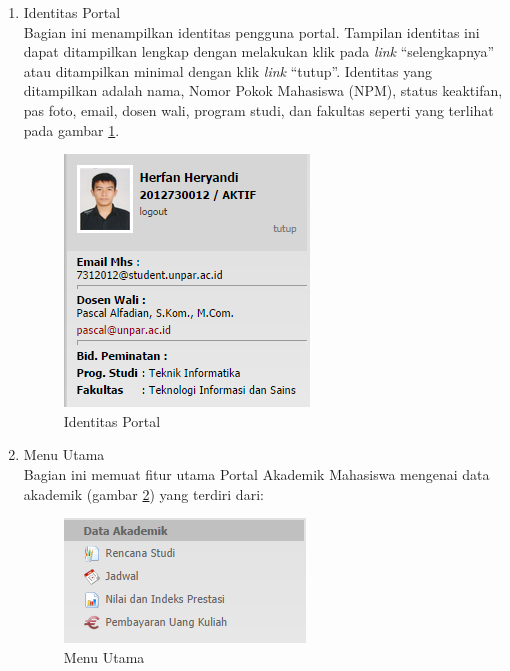 \documentclass[a4paper,twoside]{article}
\begin{document}
\begin{enumerate}
\begin{enumerate}
\begin{enumerate}
	\item Identitas Portal \\
	Bagian ini menampilkan identitas pengguna portal. Tampilan identitas ini dapat ditampilkan lengkap dengan melakukan klik pada \textit{link} ``selengkapnya'' atau ditampilkan minimal dengan klik \textit{link} ``tutup''. Identitas yang ditampilkan adalah nama, Nomor Pokok Mahasiswa (NPM), status keaktifan, pas foto, email, dosen wali, program studi, dan fakultas seperti yang terlihat pada gambar \ref{fig:3_pam_identitas}.   
	\begin{figure}[H]
			\centering
			\includegraphics[scale=0.75]{Gambar/pam-identitas}
			\caption{Identitas Portal} 
			\label{fig:3_pam_identitas}
		\end{figure}
		
	\item Menu Utama\\
	Bagian ini memuat fitur utama Portal Akademik Mahasiswa mengenai data akademik (gambar \ref{fig:3_pam_utama}) yang terdiri dari:
		\begin{figure}[H]
			\centering
			\includegraphics[scale=0.75]{Gambar/pam-utama}
			\caption{Menu Utama} 
			\label{fig:3_pam_utama}
		\end{figure}
	\begin{itemize}
	

\end{itemize}
\end{enumerate}
\end{enumerate}
\end{enumerate}
\end{document}
